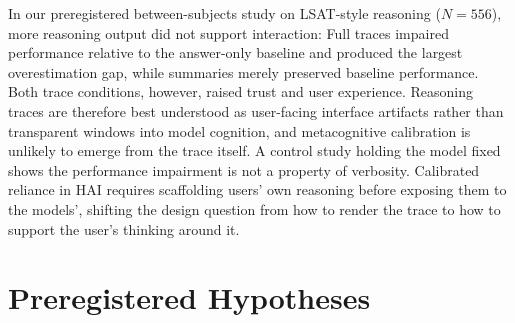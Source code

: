 \documentclass[manuscript,review,anonymous]{acmart}
\begin{document}
In our preregistered between-subjects study on LSAT-style reasoning ($N=556$), more reasoning output did not support interaction: Full traces impaired performance relative to the answer-only baseline and produced the largest overestimation gap, while summaries merely preserved baseline performance. Both trace conditions, however, raised trust and user experience. Reasoning traces are therefore best understood as user-facing interface artifacts rather than transparent windows into model cognition, and metacognitive calibration is unlikely to emerge from the trace itself. A control study holding the model fixed shows the performance impairment is not a property of verbosity. Calibrated reliance in HAI requires scaffolding users' own reasoning before exposing them to the models', shifting the design question from how to render the trace to how to support the user's thinking around it.

\begin{acks}

\end{acks}





\appendix


\section{Preregistered Hypotheses}
\end{document}
